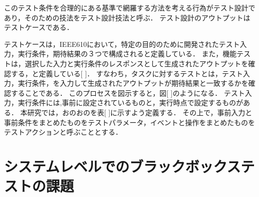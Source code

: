 このテスト条件を合理的にある基準で網羅する方法を考える行為がテスト設計であり，そのための技法をテスト設計技法と呼ぶ．
テスト設計のアウトプットはテストケースである．

テストケースは，IEEE610において，特定の目的のために開発されたテスト入力，実行条件，期待結果の３つで構成されると定義している．
また，機能テストは，選択した入力と実行条件のレスポンスとして生成されたアウトプットを確認する，と定義している[ ]．
すなわち，タスクに対するテストとは，テスト入力，実行条件，を入力して生成されたアウトプットが期待結果と一致するかを確認することである．
このプロセスを図示すると，図[  ]のようになる．
テスト入力，実行条件には,事前に設定されているものと，実行時点で設定するものがある．
本研究では，おのおのを表[  ]に示すよう定義する．
その上で，事前入力と事前条件をまとめたものをテストパラメータ，イベントと操作をまとめたものをテストアクションと呼ぶこととする．

\section{システムレベルでのブラックボックステストの課題} \label{sec:2-2}
